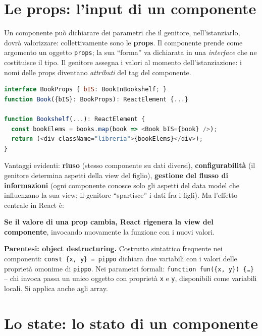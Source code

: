 \section{Le props: l'input di un componente}

\begin{definizione}[Props]
Un componente pu\`o dichiarare dei parametri che il genitore, nell'istanziarlo, dovr\`a
valorizzare: collettivamente sono le \textbf{props}. Il componente prende come argomento un
oggetto \texttt{props}; la sua ``forma'' va dichiarata in una \emph{interface} che ne
costituisce il tipo. Il genitore assegna i valori al momento dell'istanziazione: i nomi delle
props diventano \emph{attributi} del tag del componente.
\begin{lstlisting}[language=JavaScript]
interface BookProps { bIS: BookInBookshelf; }
function Book({bIS}: BookProps): ReactElement {...}

function Bookshelf(...): ReactElement {
  const bookElems = books.map(book => <Book bIS={book} />);
  return (<div className="libreria">{bookElems}</div>);
}
\end{lstlisting}
\end{definizione}

Vantaggi evidenti: \textbf{riuso} (stesso componente su dati diversi),
\textbf{configurabilit\`a} (il genitore determina aspetti della view del figlio),
\textbf{gestione del flusso di informazioni} (ogni componente conosce solo gli aspetti del
data model che influenzano la sua view; il genitore ``spartisce'' i dati fra i figli).
Ma l'effetto centrale in React \`e:
\begin{importante}
\textbf{Se il valore di una prop cambia, React rigenera la view del componente}, invocando
nuovamente la funzione con i nuovi valori.
\end{importante}

\textbf{Parentesi: object destructuring.} Costrutto sintattico frequente nei componenti:
\texttt{const \{x, y\} = pippo} dichiara due variabili con i valori delle propriet\`a
omonime di \texttt{pippo}. Nei parametri formali: \texttt{function fun(\{x, y\}) \{\dots\}}
-- chi invoca passa un unico oggetto con propriet\`a \texttt{x} e \texttt{y}, disponibili
come variabili locali. Si applica anche agli array.

\section{Lo state: lo stato di un componente}

